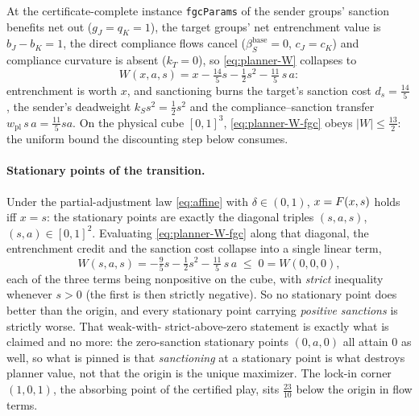 At the certificate-complete instance \texttt{fgcParams} of
 the sender groups' sanction benefits net out
($g_J=q_K=1$), the target groups' net entrenchment value is
$b_J-b_K=1$, the direct compliance flows cancel
($\beta^{\mathrm{base}}_S=0$, $c_J=c_K$) and compliance curvature is
absent ($k_T=0$), so \eqref{eq:planner-W} collapses to
\begin{equation}
W(x,a,s)=x-\tfrac{14}{5}s-\tfrac12 s^2-\tfrac{11}{5}\,s\,a :
\label{eq:planner-W-fgc}
\end{equation}
entrenchment is worth $x$, and sanctioning burns the target's sanction
cost $d_s=\tfrac{14}{5}$, the sender's deadweight $k_S s^2=\tfrac12 s^2$
and the compliance--sanction transfer $w_{\mathrm{pl}}\,s\,a=\tfrac{11}{5}sa$. On the
physical cube $[0,1]^3$, \eqref{eq:planner-W-fgc} obeys
$\lvert W\rvert\le\tfrac{13}{2}$: the uniform bound the discounting
step below consumes.

\paragraph{Stationary points of the transition.}
Under the partial-adjustment law \eqref{eq:affine} with $\delta\in(0,1)$,
$x=F(x,s)$ holds iff $x=s$: the stationary points are exactly the
diagonal triples $(s,a,s)$, $(s,a)\in[0,1]^2$. Evaluating
\eqref{eq:planner-W-fgc} along that diagonal, the entrenchment credit and
the sanction cost collapse into a single linear term,
\[
W(s,a,s)=-\tfrac95 s-\tfrac12 s^2-\tfrac{11}{5}\,s\,a\;\le\;0=W(0,0,0),
\]
each of the three terms being nonpositive on the cube, with \emph{strict}
inequality whenever $s>0$ (the first is then strictly negative). So no
stationary point does better than the origin, and every stationary point
carrying \emph{positive sanctions} is strictly worse. That weak-with-
strict-above-zero statement is exactly what is claimed and no more: the
zero-sanction stationary points $(0,a,0)$ all attain $0$ as well, so what
is pinned is that \emph{sanctioning} at a stationary point is what
destroys planner value, not that the origin is the unique maximizer.
The lock-in corner $(1,0,1)$, the absorbing point of the certified play,
sits $\tfrac{23}{10}$ below the origin in flow terms.

